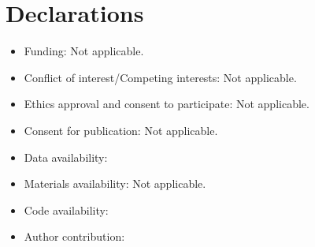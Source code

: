 \documentclass[pdflatex,sn-mathphys-num]{sn-jnl}
\begin{document}
\backmatter



\section*{Declarations}
\begin{itemize}
\item Funding: Not applicable.
\item Conflict of interest/Competing interests: Not applicable.
\item Ethics approval and consent to participate: Not applicable.
\item Consent for publication: Not applicable.
\item Data availability: %
\item Materials availability: Not applicable.
\item Code availability: %
\item Author contribution: %
\end{itemize}


\end{document}
